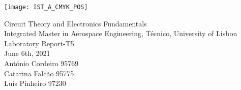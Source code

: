 \thispagestyle {empty}

\texttt{[image: IST\_A\_CMYK\_POS]}

\begin{center}
%
\vspace{1.0cm}



\vspace{1cm}
{\FontLb Circuit Theory and Electronics Fundamentals} \\ 
\vspace{1cm}
{\FontSn Integrated Master in Aerospace Engineering, Técnico, University of Lisbon} \\ 
\vspace{1cm}
{\FontSn Laboratory Report-T5} \\
\vspace{1cm}
{\FontSn June 6th, 2021} \\ 
\vspace{1cm}
{\FontSn António Cordeiro 95769} \\ 
\vspace{00.5cm}
{\FontSn Catarina Falcão 95775} \\ 
\vspace{0.5cm}
{\FontSn Luís Pinheiro 97230} \\ 
\end{center}

\newpage


